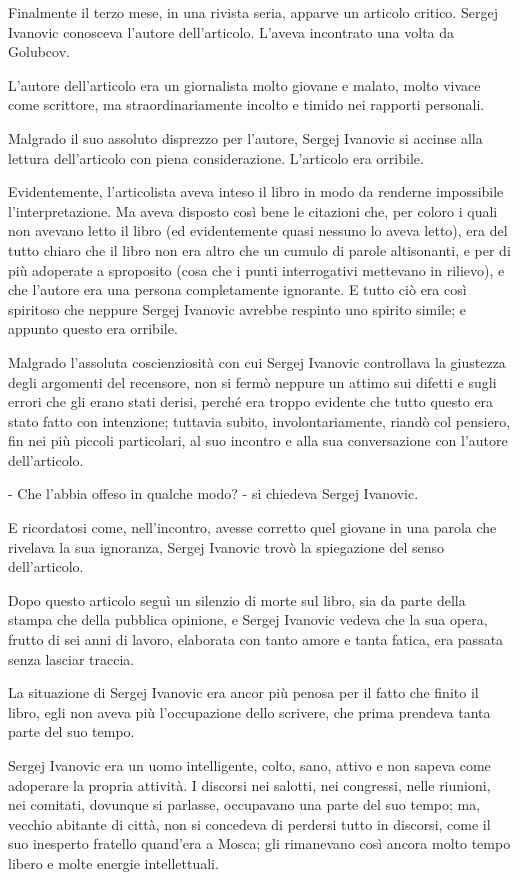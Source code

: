 Finalmente il terzo mese, in una rivista seria, apparve un articolo critico. Sergej Ivanovic conosceva l'autore dell'articolo. L'aveva incontrato una volta da Golubcov. 

L'autore dell'articolo era un giornalista molto giovane e malato, molto vivace come scrittore, ma straordinariamente incolto e timido nei rapporti personali. 

Malgrado il suo assoluto disprezzo per l'autore, Sergej Ivanovic si accinse alla lettura dell'articolo con piena considerazione. L'articolo era orribile. 

Evidentemente, l'articolista aveva inteso il libro in modo da renderne impossibile l'interpretazione. Ma aveva disposto così bene le citazioni che, per coloro i quali non avevano letto il libro (ed evidentemente quasi nessuno lo aveva letto), era del tutto chiaro che il libro non era altro che un cumulo di parole altisonanti, e per di più adoperate a sproposito (cosa che i punti interrogativi mettevano in rilievo), e che l'autore era una persona completamente ignorante. E tutto ciò era così spiritoso che neppure Sergej Ivanovic avrebbe respinto uno spirito simile; e appunto questo era orribile. 

Malgrado l'assoluta coscienziosità con cui Sergej Ivanovic controllava la giustezza degli argomenti del recensore, non si fermò neppure un attimo sui difetti e sugli errori che gli erano stati derisi, perché era troppo evidente che tutto questo era stato fatto con intenzione; tuttavia subito, involontariamente, riandò col pensiero, fin nei più piccoli particolari, al suo incontro e alla sua conversazione con l'autore dell'articolo. 

- Che l'abbia offeso in qualche modo? - si chiedeva Sergej Ivanovic. 

E ricordatosi come, nell'incontro, avesse corretto quel giovane in una parola che rivelava la sua ignoranza, Sergej Ivanovic trovò la spiegazione del senso dell'articolo. 

Dopo questo articolo seguì un silenzio di morte sul libro, sia da parte della stampa che della pubblica opinione, e Sergej Ivanovic vedeva che la sua opera, frutto di sei anni di lavoro, elaborata con tanto amore e tanta fatica, era passata senza lasciar traccia. 

La situazione di Sergej Ivanovic era ancor più penosa per il fatto che finito il libro, egli non aveva più l'occupazione dello scrivere, che prima prendeva tanta parte del suo tempo. 

Sergej Ivanovic era un uomo intelligente, colto, sano, attivo e non sapeva come adoperare la propria attività. I discorsi nei salotti, nei congressi, nelle riunioni, nei comitati, dovunque si parlasse, occupavano una parte del suo tempo; ma, vecchio abitante di città, non si concedeva di perdersi tutto in discorsi, come il suo inesperto fratello quand'era a Mosca; gli rimanevano così ancora molto tempo libero e molte energie intellettuali. 


